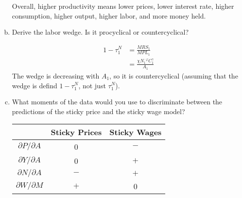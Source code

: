 \documentclass[answers]{exam}
\newcommand{\1}{\mathbf{1}}
\begin{document}
\begin{enumerate}[(a)]
\begin{solution}
        Overall, higher productivity means lower prices, lower interest rate, higher consumption, higher output, higher labor, and more money held.
    \end{solution}
	\item Derive the labor wedge. Is it procyclical or countercyclical?
	\begin{solution}
        \begin{align*}
            1 - \tau^N_1 & = \frac{MRS_1}{MPL_1} \\
            & = \frac{\chi {N_1}^\varphi C_1^\gamma}{A_1}
        \end{align*}
        The wedge is decreasing with $A_1$, so it is countercyclical (assuming that the wedge is defind $1-\tau_1^N$, not just $\tau_1^N$).
    \end{solution}
	\item What moments of the data would you use to discriminate between the predictions of the sticky price and the sticky wage model?
	\begin{solution}
        \begin{center}
            \begin{tabular}{|c|c|c|}
                \hline
                & Sticky Prices & Sticky Wages \\
                \hline
                $\partial P/\partial A$ & 0 & $-$ \\
                $\partial Y/\partial A$ & 0 & $+$ \\
                $\partial N/\partial A$ & $-$ & $+$ \\
                $\partial W/\partial M$ & $+$ & 0 \\
                \hline
            \end{tabular}
        \end{center}
    \end{solution}
\end{enumerate}
\end{document}
